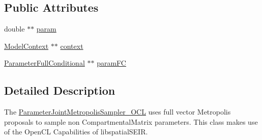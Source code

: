 \subsection*{Public Attributes}
\begin{DoxyCompactItemize}
\item 
double $\ast$$\ast$ \hyperlink{classSpatialSEIR_1_1ParameterJointMetropolisSampler__OCL_aa010e1643feb5965065efb65fd101a6f}{param}
\item 
\hyperlink{classSpatialSEIR_1_1ModelContext}{Model\-Context} $\ast$$\ast$ \hyperlink{classSpatialSEIR_1_1ParameterJointMetropolisSampler__OCL_acce9d454489373f0549af4f15dade51a}{context}
\item 
\hyperlink{classSpatialSEIR_1_1ParameterFullConditional}{Parameter\-Full\-Conditional} $\ast$$\ast$ \hyperlink{classSpatialSEIR_1_1ParameterJointMetropolisSampler__OCL_a143445da6bf7037f86020e04185f4472}{param\-F\-C}
\end{DoxyCompactItemize}


\subsection{Detailed Description}
The \hyperlink{classSpatialSEIR_1_1ParameterJointMetropolisSampler__OCL}{Parameter\-Joint\-Metropolis\-Sampler\-\_\-\-O\-C\-L} uses full vector Metropolis proposals to sample non Compartmental\-Matrix parameters. This class makes use of the Open\-C\-L Capabilities of libspatial\-S\-E\-I\-R. 

